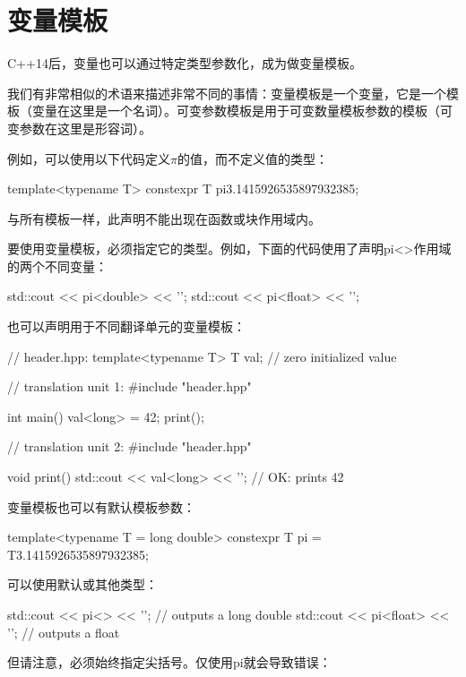 \section{变量模板}
C++14后，变量也可以通过特定类型参数化，成为做变量模板。

\begin{notice}
我们有非常相似的术语来描述非常不同的事情：变量模板是一个变量，它是一个模板（变量在这里是一个名词）。可变参数模板是用于可变数量模板参数的模板（可变参数在这里是形容词）。
\end{notice}

例如，可以使用以下代码定义$\pi$的值，而不定义值的类型：

\begin{cpp}
template<typename T>
constexpr T pi{3.1415926535897932385};
\end{cpp}

与所有模板一样，此声明不能出现在函数或块作用域内。

要使用变量模板，必须指定它的类型。例如，下面的代码使用了声明pi<>作用域的两个不同变量：

\begin{cpp}
std::cout << pi<double> << '\n';
std::cout << pi<float> << '\n';
\end{cpp}

也可以声明用于不同翻译单元的变量模板：

\begin{cpp}
// header.hpp:
template<typename T> T val{}; // zero initialized value

// translation unit 1:
#include "header.hpp"

int main() {
	val<long> = 42;
	print();
}

// translation unit 2:
#include "header.hpp"

void print() {
	std::cout << val<long> << '\n'; // OK: prints 42
}
\end{cpp}

变量模板也可以有默认模板参数：

\begin{cpp}
template<typename T = long double>
constexpr T pi = T{3.1415926535897932385};
\end{cpp}

可以使用默认或其他类型：

\begin{cpp}
std::cout << pi<> << '\n'; // outputs a long double
std::cout << pi<float> << '\n'; // outputs a float
\end{cpp}

但请注意，必须始终指定尖括号。仅使用pi就会导致错误：

